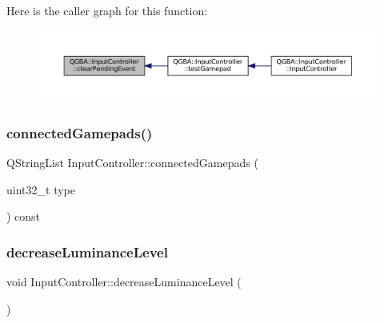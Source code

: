 Here is the caller graph for this function\+:
\nopagebreak
\begin{figure}[H]
\begin{center}
\leavevmode
\includegraphics[width=350pt]{class_q_g_b_a_1_1_input_controller_a2fe06ce5ff99d006a7e774c1fbfde1c7_icgraph}
\end{center}
\end{figure}
\mbox{\label{class_q_g_b_a_1_1_input_controller_ac54e10c00a8dcf3b8687a59a736b2fac}} 
\subsubsection{\texorpdfstring{connected\+Gamepads()}{connectedGamepads()}}
{\footnotesize\ttfamily Q\+String\+List Input\+Controller\+::connected\+Gamepads (\begin{DoxyParamCaption}\item[{uint32\+\_\+t}]{type }\end{DoxyParamCaption}) const}

\mbox{\label{class_q_g_b_a_1_1_input_controller_a774ccf527bcb6167c25259b8ace0483f}} 
\subsubsection{\texorpdfstring{decrease\+Luminance\+Level}{decreaseLuminanceLevel}}
{\footnotesize\ttfamily void Input\+Controller\+::decrease\+Luminance\+Level (\begin{DoxyParamCaption}{ }\end{DoxyParamCaption})\hspace{0.3cm}{\ttfamily [slot]}}

